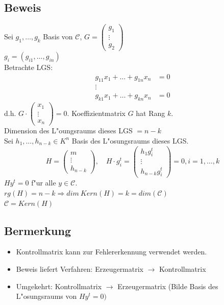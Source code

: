 \subsection{Beweis}
Sei $g_1,\ldots,g_k$ Basis von $\mathcal{C}$, $G=
\begin{pmatrix}
g_1 \\
\vdots \\
g_2
\end{pmatrix} $ \\
$g_i=(g_{i1},\ldots,g_{in})$\\
Betrachte LGS: 
\begin{align*}
	g_{11} x_1 + \ldots + g_{1n} x_n &= 0\\
	\vdots&\\
	g_{k1} x_1 + \ldots + g_{kn} x_n &= 0
\end{align*}
d.h. $G \cdot
\begin{pmatrix}
x_1 \\
\vdots \\
x_n
\end{pmatrix}
= 0$. Koeffizientmatrix $G$ hat Rang $k$.\\
Dimension des L"oungsraums dieses LGS $= n - k$ \\
Sei $h_1,\ldots,h_{n-k} \in K^n$ Basis des L"osungsraums dieses LGS. \\
\[
	H=
	\begin{pmatrix}
	m\\
	\vdots \\
	h_{n-k}
	\end{pmatrix}
	, \quad H \cdot g^t_i =
	\begin{pmatrix}
	h_1 g_i^t \\
	\vdots \\
	h_{n-k} g_i^t
	\end{pmatrix}
	 =0,i=1,\ldots,k
\]
$H y^t=0$ f"ur alle $y \in \mathcal{C}$.\\
$rg(H)=n-k \Rightarrow dim\ Kern(H) = k = dim ( \mathcal{C})$\\
$\mathcal{C}=Kern(H)$

\subsection{Bermerkung}
\begin{itemize}
	\item Kontrollmatrix kann zur Fehlererkennung verwendet werden.	
	\item Beweis liefert Verfahren: Erzeugermatrix $\rightarrow$ Kontrollmatrix
	\item Umgekehrt: Kontrollmatrix $\rightarrow$ Erzeugermatrix (Bilde Basis des L"osungsraums von $H y^t=0)$
\end{itemize}

